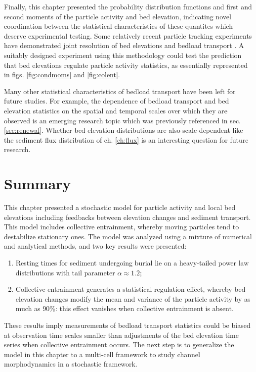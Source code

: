 Finally, this chapter presented the probability distribution functions and first and second moments of the particle activity and bed elevation, indicating novel coordination between the statistical characteristics of these quantites which deserve experimental testing.
Some relatively recent particle tracking experiments have demonstrated joint resolution of bed elevations and bedload transport \citep{Martin2014,Heyman2016}.
A suitably designed experiment using this methodology could test the prediction that bed elevations regulate particle activity statistics, as essentially represented in figs. \ref{fig:condmoms} and \ref{fig:colent}. 

Many other statistical characteristics of bedload transport have been left for future studies. 
For example, the dependence of bedload transport \citep{Saletti2015,Singh2009} and bed elevation statistics \citep{Aberle2006, Singh2009,Singh2012} on the spatial and temporal scales over which they are observed is an emerging research topic which was previously referenced in sec. \ref{sec:renewal}.
Whether bed elevation distributions are also scale-dependent like the sediment flux distribution of ch. \ref{ch:flux} is an interesting question for future research.

\section{Summary}
\label{sec:eleconclusion}

This chapter presented a stochastic model for particle activity and local bed elevations including feedbacks between elevation changes and sediment transport.
This model includes collective entrainment, whereby moving particles tend to destabilize stationary ones.
The model was analyzed using a mixture of numerical and analytical methods, and two key results were presented:
\begin{enumerate}
	\item Resting times for sediment undergoing burial lie on a heavy-tailed power law distributions with tail parameter $\alpha \approx 1.2$;
	\item Collective entrainment generates a statistical regulation effect, whereby bed elevation changes modify the mean and variance of the particle activity by as much as 90\%: this effect vanishes when collective entrainment is absent.
\end{enumerate}
These results imply measurements of bedload transport statistics could be biased at observation time scales smaller than adjustments of the bed elevation time series when collective entrainment occurs.
The next step is to generalize the model in this chapter to a multi-cell framework to study channel morphodynamics in a stochastic framework.
